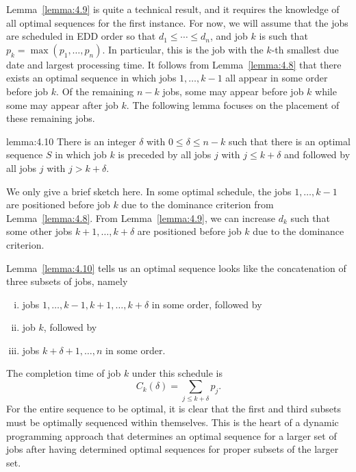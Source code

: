 Lemma~\ref{lemma:4.9} is quite a technical result, and it requires the 
knowledge of all optimal sequences for the first instance. 
For now, we will assume that the jobs are scheduled in EDD order 
so that $d_1 \leq \cdots \leq d_n$, and job $k$ is such that 
$p_k = \max(p_1, \dots, p_n)$. In particular, this is the job with 
the $k$-th smallest due date and largest processing time. It follows from 
Lemma~\ref{lemma:4.8} that there exists an optimal sequence in which 
jobs $1, \dots, k-1$ all appear in some order before job $k$. Of the remaining 
$n-k$ jobs, some may appear before job $k$ while some may appear after job $k$. 
The following lemma focuses on the placement of these remaining jobs. 

\begin{lemma}{lemma:4.10}
    There is an integer $\delta$ with $0 \leq \delta \leq n-k$ such that there 
    is an optimal sequence $S$ in which job $k$ is preceded by all jobs $j$ 
    with $j \leq k + \delta$ and followed by all jobs $j$ with $j > k + \delta$. 
\end{lemma}
\begin{pf}
    We only give a brief sketch here. In some optimal schedule, the jobs 
    $1, \dots, k-1$ are positioned before 
    job $k$ due to the dominance criterion from Lemma~\ref{lemma:4.8}. 
    From Lemma~\ref{lemma:4.9}, we can increase $d_k$ such that some other 
    jobs $k+1, \dots, k+\delta$ are positioned before job $k$ due to the 
    dominance criterion. 
\end{pf}

Lemma~\ref{lemma:4.10} tells us an optimal sequence looks like the concatenation 
of three subsets of jobs, namely 
\begin{enumerate}[(i)]
    \item jobs $1, \dots, k-1, k+1, \dots, k+\delta$ in some order, followed by 
    \item job $k$, followed by 
    \item jobs $k+\delta+1, \dots, n$ in some order. 
\end{enumerate}
The completion time of job $k$ under this schedule is 
\[ C_k(\delta) = \sum_{j\leq k+\delta} p_j. \] 
For the entire sequence to be optimal, it is clear that the first and third 
subsets must be optimally sequenced within themselves. This is the heart of 
a dynamic programming approach that determines an optimal sequence for a 
larger set of jobs after having determined optimal sequences for proper 
subsets of the larger set. 

